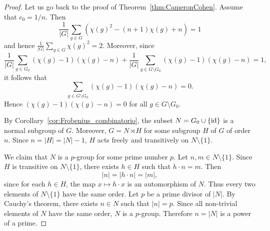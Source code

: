 \begin{proof}
    Let us go back to the proof
    of Theorem~\ref{thm:CameronCohen}. Assume that 
    $c_0=1/n$. Then
    \[
    \frac{1}{|G|}\sum_{g\in G}(\chi(g)^2-(n+1)\chi(g)+n)=1
    \]
    and hence $\frac{1}{|G|}\sum_{g\in G}\chi(g)^2=2$. Moreover, 
    since 
    \[
    \frac{1}{|G|}\sum_{g\in G_0}(\chi(g)-1)(\chi(g)-n)
    +\frac{1}{|G|}\sum_{g\in G\setminus G_0}(\chi(g)-1)(\chi(g)-n)=1,
    \]
    it follows that 
    \[
    \sum_{g\in G\setminus G_0}(\chi(g)-1)(\chi(g)-n)=0.
    \]
    Hence $(\chi(g)-1)(\chi(g)-n)=0$
    for all $g\in G\setminus G_0$. 
    
    By Corollary~\ref{cor:Frobenius_combinatorio}, 
    the subset $N=G_0\cup\{\operatorname{id}\}$ is a normal subgroup of $G$. Moreover, $G=N\rtimes H$ for some 
    subgroup $H$ of $G$ of order $n$. Since 
    $n=|H|=|N|-1$, $H$ acts freely and transitively 
    on $N\setminus\{1\}$. 

    We claim that $N$ is a $p$-group for some prime number $p$. Let $n,m\in N\setminus\{1\}$. Since $H$ is transitive on $N\setminus\{1\}$, 
    there exists $h\in H$ such that $h\cdot n=m$. Then
    \[
    |n|=|h\cdot n|=|m|,
    \]
    since for each $h\in H$, the map 
    $x\mapsto h\cdot x$ is an automorphism of $N$. Thus every two elements of $N\setminus\{1\}$ have 
    the same order. Let $p$ be a prime divisor 
    of $|N|$. By Cauchy's theorem, there exists 
    $n\in N$ such that $|n|=p$. Since all non-trivial
    elements of $N$ have the same order, 
    $N$ is a $p$-group. Therefore 
    $n=|N|$ is a power of a prime.
\end{proof}


